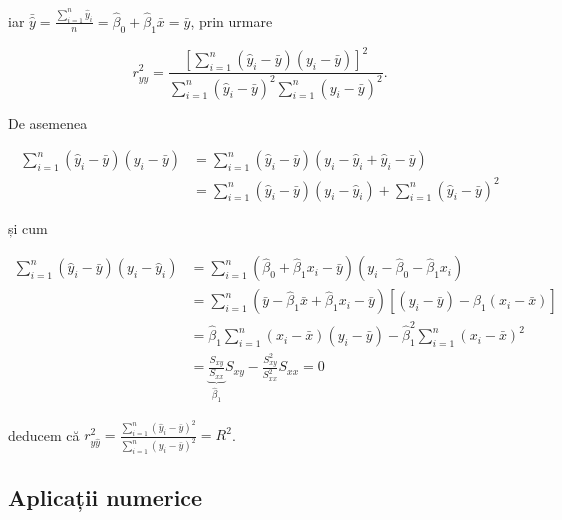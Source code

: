 \documentclass[]{article}
\begin{document}
iar
\(\bar{\hat y} = \frac{\sum_{i = 1}^{n}\hat y_i}{n} = \hat \beta_0 + \hat\beta_1 \bar x = \bar y\),
prin urmare

\[
r_{y\hat y}^2 = \frac{\left[\sum_{i = 1}^{n}(\hat y_i - \bar{y})(y_i - \bar y)\right]^2}{\sum_{i = 1}^{n}(\hat y_i - \bar{y})^2\sum_{i = 1}^{n}(y_i - \bar y)^2}.
\]

De asemenea

\begin{align*}
\sum_{i = 1}^{n}(\hat y_i - \bar{y})(y_i - \bar y) &= \sum_{i = 1}^{n}(\hat y_i - \bar{y})(y_i - \hat y_i + \hat y_i - \bar y) \\
 &= \sum_{i = 1}^{n}(\hat y_i - \bar{y})(y_i - \hat y_i) + \sum_{i = 1}^{n}(\hat y_i - \bar{y})^2
\end{align*}

și cum

\begin{align*}
\sum_{i = 1}^{n}(\hat y_i - \bar{y})(y_i - \hat y_i) &= \sum_{i = 1}^{n}(\hat \beta_0 + \hat\beta_1 x_i - \bar{y})(y_i - \hat \beta_0 - \hat\beta_1 x_i) \\
  &= \sum_{i = 1}^{n}(\bar y - \hat\beta_1 \bar x + \hat\beta_1 x_i - \bar{y})[(y_i - \bar y ) - \hat\beta_1 (x_i - \bar x)]\\
  &= \hat\beta_1 \sum_{i = 1}^{n}(x_i - \bar x)(y_i - \bar y) - \hat\beta_1^2 \sum_{i = 1}^{n}(x_i - \bar x)^2 \\
  &= \underbrace{\frac{S_{xy}}{S_{xx}}}_{\hat\beta_1}S_{xy} - \frac{S_{xy}^2}{S_{xx}^2}S_{xx} = 0
\end{align*}

deducem că
\(r_{y\hat y}^2 = \frac{\sum_{i = 1}^{n}(\hat y_i - \bar{y})^2}{\sum_{i = 1}^{n}(y_i - \bar y)^2} = R^2\).

\hypertarget{aplicatii-numerice}{%
\subsection{Aplicații numerice}\label{aplicatii-numerice}}
\end{document}
